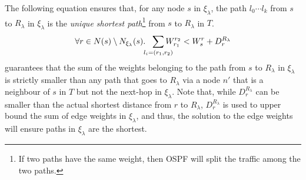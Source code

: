 The following equation ensures that, for any node $s$ in 
$\xi_\lambda$, 
the path $l_0\cdots l_k$ from $s$ to $R_\lambda$ 
in $\xi_\lambda$ is the 
\emph{unique shortest path}\footnote{
If two paths have the same weight, then OSPF will 
split the traffic among the two paths.
} from $s$ to $R_\lambda$ in $T$.
\begin{equation} \label{eq:unique}
\forall r \in N(s) \setminus N_{\xi_\lambda}(s).~~
\sum_{\mathclap{\substack{l_i=(r_1,r_2)}}} 
W_{r_1}^{r_2} < W_{s}^{r}+ D_{r}^{R_\lambda}
\end{equation}
 guarantees that 
the sum of the weights belonging to the path 
from $s$ to $R_\lambda$ in $\xi_\lambda$ 
is strictly smaller than 
any path that goes to $R_\lambda$ via 
a node $n'$ that is a neighbour of $s$ in $T$ but not 
the next-hop in $\xi_\lambda$. Note that,
while $D_{r}^{R_\lambda}$ can be smaller 
than the actual shortest
distance from $r$ to $R_\lambda$, 
$D_{r}^{R_\lambda}$ is used to upper bound the sum of edge weights 
in $\xi_\lambda$, and  
thus, the solution to the edge weights will ensure 
paths in $\xi_\lambda$ are the shortest. 

%					
